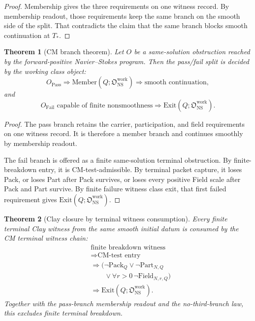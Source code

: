 \documentclass[11pt]{article}
\newtheorem{theorem}{Theorem}
\newcommand{\NS}{\mathrm{NS}}
\newcommand{\Pack}{\mathrm{Pack}}
\newcommand{\Part}{\mathrm{Part}}
\newcommand{\Field}{\mathrm{Field}}
\newcommand{\Member}{\mathrm{Member}}
\newcommand{\Exit}{\mathrm{Exit}}
\newcommand{\Owork}{\mathfrak O_{\NS}^{\mathrm{work}}}
\newcommand{\Pass}{\mathrm{Pass}}
\newcommand{\Fail}{\mathrm{Fail}}
\begin{document}
\begin{proof}
Membership gives the three requirements on one witness record.
By membership readout, those requirements keep the same branch on the smooth side of the split.
That contradicts the claim that the same branch blocks smooth continuation at \(T_*\).
\end{proof}

\begin{theorem}[CM branch theorem]
Let \(O\) be a same-solution obstruction reached by the forward-positive Navier--Stokes program.
Then the pass/fail split is decided by the working class object:
\[
  O_{\Pass}\Longrightarrow \Member(Q;\Owork)\Longrightarrow\text{smooth continuation},
\]
and
\[
  O_{\Fail}\text{ capable of finite nonsmoothness}
  \Longrightarrow
  \Exit(Q;\Owork).
\]
\end{theorem}

\begin{proof}
The pass branch retains the carrier, participation, and field requirements on one witness record.
It is therefore a member branch and continues smoothly by membership readout.

The fail branch is offered as a finite same-solution terminal obstruction.
By finite-breakdown entry, it is CM-test-admissible.
By terminal packet capture, it loses Pack, or loses Part after Pack survives, or loses every positive Field scale after Pack and Part survive.
By finite failure witness class exit, that first failed requirement gives \(\Exit(Q;\Owork)\).
\end{proof}

\begin{theorem}[Clay closure by terminal witness consumption]
Every finite terminal Clay witness from the same smooth initial datum is consumed by the CM terminal witness chain:
\[
\begin{aligned}
&\text{finite breakdown witness}\\
&\Longrightarrow \text{CM-test entry}\\
&\Longrightarrow
  \bigl(\neg\Pack_Q\vee\neg\Part_{N,Q}\\
&\qquad\vee\forall r>0\,\neg\Field_{N,r,Q}\bigr)\\
&\Longrightarrow \Exit(Q;\Owork).
\end{aligned}
\]
Together with the pass-branch membership readout and the no-third-branch law, this excludes finite terminal breakdown.
\end{theorem}
\end{document}
